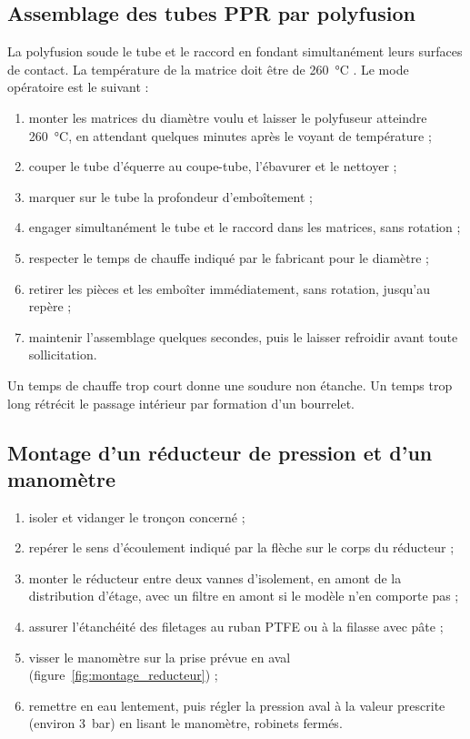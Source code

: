 \subsection{Assemblage des tubes PPR par polyfusion}
La polyfusion soude le tube et le raccord en fondant simultanément leurs surfaces de contact.
La température de la matrice doit être de \SI{260}{\celsius} \cite{wavinPPR}. Le mode
opératoire est le suivant :
\begin{enumerate}
  \item monter les matrices du diamètre voulu et laisser le polyfuseur atteindre
        \SI{260}{\celsius}, en attendant quelques minutes après le voyant de température ;
  \item couper le tube d'équerre au coupe-tube, l'ébavurer et le nettoyer ;
  \item marquer sur le tube la profondeur d'emboîtement ;
  \item engager simultanément le tube et le raccord dans les matrices, sans rotation ;
  \item respecter le temps de chauffe indiqué par le fabricant pour le diamètre ;
  \item retirer les pièces et les emboîter immédiatement, sans rotation, jusqu'au repère ;
  \item maintenir l'assemblage quelques secondes, puis le laisser refroidir avant toute
        sollicitation.
\end{enumerate}
Un temps de chauffe trop court donne une soudure non étanche. Un temps trop long rétrécit le
passage intérieur par formation d'un bourrelet.

\subsection{Montage d'un réducteur de pression et d'un manomètre}
\begin{enumerate}
  \item isoler et vidanger le tronçon concerné ;
  \item repérer le sens d'écoulement indiqué par la flèche sur le corps du réducteur ;
  \item monter le réducteur entre deux vannes d'isolement, en amont de la distribution d'étage,
        avec un filtre en amont si le modèle n'en comporte pas ;
  \item assurer l'étanchéité des filetages au ruban PTFE ou à la filasse avec pâte ;
  \item visser le manomètre sur la prise prévue en aval (figure~\ref{fig:montage_reducteur}) ;
  \item remettre en eau lentement, puis régler la pression aval à la valeur prescrite
        (environ \SI{3}{bar}) en lisant le manomètre, robinets fermés.
\end{enumerate}

